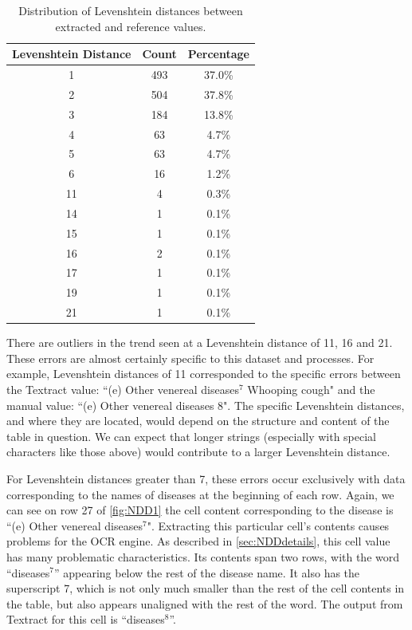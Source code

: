 \documentclass[12pt]{article}
\begin{document}
\begin{table}[h]
\centering
\begin{tabular}{ccc}
\hline
\textbf{Levenshtein Distance} & \textbf{Count} & \textbf{Percentage} \\
\hline
1  & 493 & 37.0\% \\
2  & 504 & 37.8\% \\
3  & 184 & 13.8\% \\
4  & 63  & 4.7\%  \\
5  & 63  & 4.7\%  \\
6  & 16  & 1.2\%  \\
11 & 4   & 0.3\%  \\
14 & 1   & 0.1\%  \\
15 & 1   & 0.1\%  \\
16 & 2   & 0.1\%  \\
17 & 1   & 0.1\%  \\
19 & 1   & 0.1\%  \\
21 & 1   & 0.1\%  \\
\hline
\end{tabular}
\caption{Distribution of Levenshtein distances between extracted and reference values.}
\label{tab:lev_dist}
\end{table}

There are outliers in the trend seen at a Levenshtein distance of 11, 16 and 21. These errors are almost certainly specific to this dataset and processes. For example, Levenshtein distances of 11 corresponded to the specific errors between the Textract value: ``(e) Other venereal diseases$^{7}$ Whooping cough" and the manual value: ``(e) Other venereal diseases 8". The specific Levenshtein distances, and where they are located, would depend on the structure and content of the table in question. We can expect that longer strings (especially with special characters like those above) would contribute to a larger Levenshtein distance. 

For Levenshtein distances greater than 7, these errors occur exclusively with data corresponding to the names of diseases at the beginning of each row. Again, we can see on row 27 of \cref{fig:NDD1} the cell content corresponding to the disease is ``(e) Other venereal diseases$^{7}$". Extracting this particular cell's contents causes problems for the OCR engine. As described in  \cref{sec:NDDdetails}, this cell value has many problematic characteristics. Its contents span two rows, with the word ``diseases$^{7}$'' appearing below the rest of the disease name. It also has the superscript 7, which is not only much smaller than the rest of the cell contents in the table, but also appears unaligned with the rest of the word. The output from Textract for this cell is ``diseases$^{8}$''. 
\end{document}
